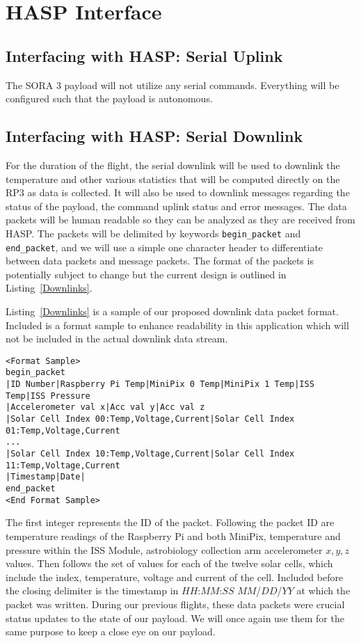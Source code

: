 \section{HASP Interface}
\label{sec:HaspInterface}

\subsection{Interfacing with HASP: Serial Uplink}
The SORA 3 payload will not utilize any serial commands. Everything will be configured such that the payload is autonomous.

\subsection{Interfacing with HASP: Serial Downlink}
For the duration of the flight, the serial downlink will be used to downlink the temperature and other various statistics that will be computed directly on the RP\num{3} as data is collected. It will also be used to downlink messages regarding the status of the payload, the command uplink status and error messages. The data packets will be human readable so they can be analyzed as they are received from HASP. The packets will be delimited by keywords \verb|begin_packet| and \verb|end_packet|, and we will use a simple one character header to differentiate between data packets and message packets. The format of the packets is potentially subject to change but the current design is outlined in Listing~\ref{Downlinks}.

Listing~\ref{Downlinks} is a sample of our proposed downlink data packet format. Included is a format sample to enhance readability in this application which will not be included in the actual downlink data stream.

\lstset{basicstyle=\small, numbers=left, xleftmargin=2em, frame=tb, label = Downlinks, framexleftmargin=1.5em}
\begin{lstlisting}[caption = Sample of proposed downlink data packets ID: 15667 - 15669]
<Format Sample>
begin_packet
|ID Number|Raspberry Pi Temp|MiniPix 0 Temp|MiniPix 1 Temp|ISS Temp|ISS Pressure
|Accelerometer val x|Acc val y|Acc val z
|Solar Cell Index 00:Temp,Voltage,Current|Solar Cell Index 01:Temp,Voltage,Current
...
|Solar Cell Index 10:Temp,Voltage,Current|Solar Cell Index 11:Temp,Voltage,Current
|Timestamp|Date|
end_packet
<End Format Sample>
\end{lstlisting}
\medskip

The first integer represents the ID of the packet. Following the packet ID are temperature readings of the Raspberry Pi and both MiniPix, temperature and pressure within the ISS Module, astrobiology collection arm accelerometer $x, y, z$ values. Then follows the set of values for each of the twelve solar cells, which include the index, temperature, voltage and current of the cell. Included before the closing delimiter is the timestamp in $HH$:$MM$:$SS$ $MM$/$DD$/$YY$ at which the packet was written.  
During our previous flights, these data packets were crucial status updates to the state of our payload. We will once again use them for the same purpose to keep a close eye on our payload.

